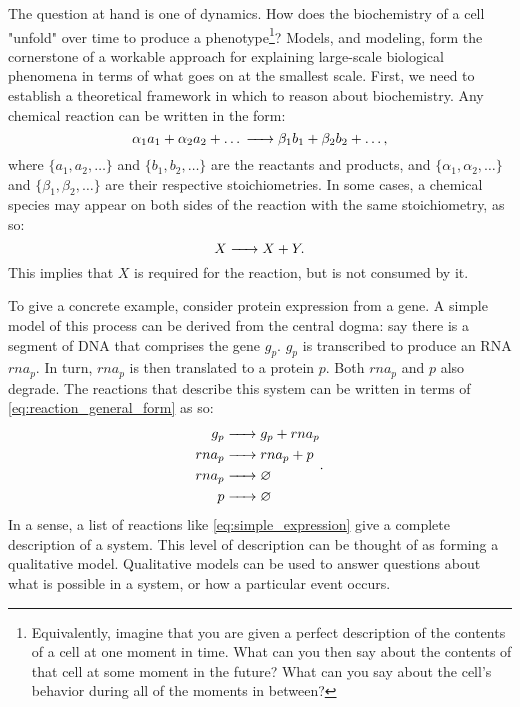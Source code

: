 The question at hand is one of dynamics. How does the biochemistry of a cell "unfold" over time to produce a phenotype\footnote{Equivalently, imagine that you are given a perfect description of the contents of a cell at one moment in time. What can you then say about the contents of that cell at some moment in the future? What can you say about the cell's behavior during all of the moments in between?}? Models, and modeling, form the cornerstone of a workable approach for explaining large-scale biological phenomena in terms of what goes on at the smallest scale. First, we need to establish a theoretical framework in which to reason about biochemistry. Any chemical reaction can be written in the form:
\begin{equation}\label{eq:reaction_general_form}
	\alpha_1 a_1 + \alpha_2 a_2 + \ldots \ce{->} \beta_1 b_1 + \beta_2 b_2 + \ldots,
\end{equation}  
where $\{a_1, a_2, \ldots \}$ and $\{b_1, b_2, \ldots \}$ are the reactants and products, and $\{\alpha_1, \alpha_2, \ldots \}$ and $\{\beta_1, \beta_2, \ldots \}$ are their respective stoichiometries. In some cases, a chemical species may appear on both sides of the reaction with the same stoichiometry, as so:
\begin{equation*}
    X \ce{->} X + Y.
\end{equation*}
This implies that $X$ is required for the reaction, but is not consumed by it.

To give a concrete example, consider protein expression from a gene. A simple model of this process can be derived from the central dogma\cite{Crick:1958ws,Crick:1970wb}: say there is a segment of DNA that comprises the gene $g_p$. $g_p$ is transcribed to produce an RNA $rna_p$. In turn, $rna_p$ is then translated to a protein $p$. Both $rna_p$ and $p$ also degrade. The reactions that describe this system can be written in terms of \eqref{eq:reaction_general_form} as so:
\begin{align}\label{eq:simple_expression}
    \begin{split}
        g_p &\ce{->} g_p + rna_p \\
        rna_p &\ce{->} rna_p + p \\
        rna_p &\ce{->} \varnothing \\
        p &\ce{->} \varnothing
    \end{split}.
\end{align}
In a sense, a list of reactions like \eqref{eq:simple_expression} give a complete description of a system. This level of description can be thought of as forming a qualitative model. Qualitative models can be used to answer questions about what is possible in a system, or how a particular event occurs.

